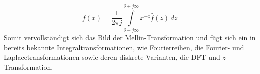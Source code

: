 \begin{equation}
    f(x) = 
    \frac{1}{2\pi j} 
    \int\limits_{\delta -j\infty}^{\delta +j\infty} 
    x^{-z} \hat{f}(z) \,{d}z
    \label{mellin:mellininv}
\end{equation}
Somit vervollständigt sich das Bild der Mellin-Transformation und fügt 
sich ein in bereits bekannte Integraltransformationen, wie Fourierreihen, 
die Fourier- und Laplacetransformationen sowie deren diskrete Varianten, 
die DFT und $z$-Transformation.



